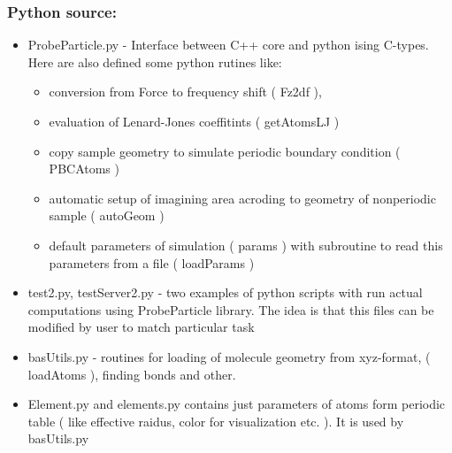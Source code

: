 \subsubsection{Python source:}
\begin{itemize}
    \item ProbeParticle.py - Interface between C++ core and python ising
    C-types. Here are also defined some python rutines like: 
    \begin{itemize}
        \item  conversion from Force to frequency shift ( Fz2df ),
        \item  evaluation of Lenard-Jones coeffitints ( getAtomsLJ )
        \item  copy sample geometry to simulate periodic boundary condition (
        PBCAtoms )
        \item automatic setup of imagining area acroding to geometry of
        nonperiodic sample ( autoGeom )
        \item default parameters of simulation ( params ) with subroutine to
        read this parameters from a file ( loadParams )
    \end{itemize}


    \item  test2.py, testServer2.py - two examples of python scripts with run
    actual computations using ProbeParticle library. The idea is that this files
    can be modified by user to match particular task
    \item basUtils.py - routines for loading of molecule geometry from
    xyz-format, ( loadAtoms ), finding bonds and other.
    \item Element.py and elements.py contains just parameters of atoms form
    periodic table ( like effective raidus, color for visualization etc. ). It
    is used by basUtils.py

        

\end{itemize}

